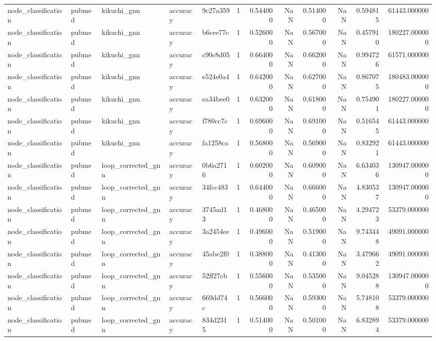 \begin{tabular}{lllllrrrrrrr}
node_classification & pubmed & kikuchi_gnn & accuracy & 9c27a359 & 1 & 0.544000 & NaN & 0.514000 & NaN & 0.594815 & 61443.000000 \\
node_classification & pubmed & kikuchi_gnn & accuracy & b6cee77c & 1 & 0.526000 & NaN & 0.567000 & NaN & 0.457910 & 180227.000000 \\
node_classification & pubmed & kikuchi_gnn & accuracy & c90c8d05 & 1 & 0.664000 & NaN & 0.662000 & NaN & 0.994726 & 61571.000000 \\
node_classification & pubmed & kikuchi_gnn & accuracy & e524e0a4 & 1 & 0.642000 & NaN & 0.627000 & NaN & 0.867075 & 180483.000000 \\
node_classification & pubmed & kikuchi_gnn & accuracy & ea34bee0 & 1 & 0.632000 & NaN & 0.618000 & NaN & 0.754901 & 180227.000000 \\
node_classification & pubmed & kikuchi_gnn & accuracy & f780cc7c & 1 & 0.696000 & NaN & 0.691000 & NaN & 0.516545 & 61443.000000 \\
node_classification & pubmed & kikuchi_gnn & accuracy & fa1258ca & 1 & 0.568000 & NaN & 0.569000 & NaN & 0.832921 & 61443.000000 \\
node_classification & pubmed & loop_corrected_gnn & accuracy & 0b6a2716 & 1 & 0.602000 & NaN & 0.609000 & NaN & 6.634036 & 130947.000000 \\
node_classification & pubmed & loop_corrected_gnn & accuracy & 34fcc483 & 1 & 0.644000 & NaN & 0.666000 & NaN & 4.830537 & 130947.000000 \\
node_classification & pubmed & loop_corrected_gnn & accuracy & 3745ad13 & 1 & 0.468000 & NaN & 0.465000 & NaN & 4.294723 & 53379.000000 \\
node_classification & pubmed & loop_corrected_gnn & accuracy & 3a2454ee & 1 & 0.496000 & NaN & 0.519000 & NaN & 9.743448 & 49091.000000 \\
node_classification & pubmed & loop_corrected_gnn & accuracy & 45abe2f0 & 1 & 0.388000 & NaN & 0.413000 & NaN & 3.479662 & 49091.000000 \\
node_classification & pubmed & loop_corrected_gnn & accuracy & 52ff27cb & 1 & 0.556000 & NaN & 0.535000 & NaN & 9.045288 & 130947.000000 \\
node_classification & pubmed & loop_corrected_gnn & accuracy & 669dd74c & 1 & 0.566000 & NaN & 0.593000 & NaN & 5.748108 & 53379.000000 \\
node_classification & pubmed & loop_corrected_gnn & accuracy & 834d2315 & 1 & 0.514000 & NaN & 0.501000 & NaN & 6.832894 & 53379.000000 \\

\end{tabular}
